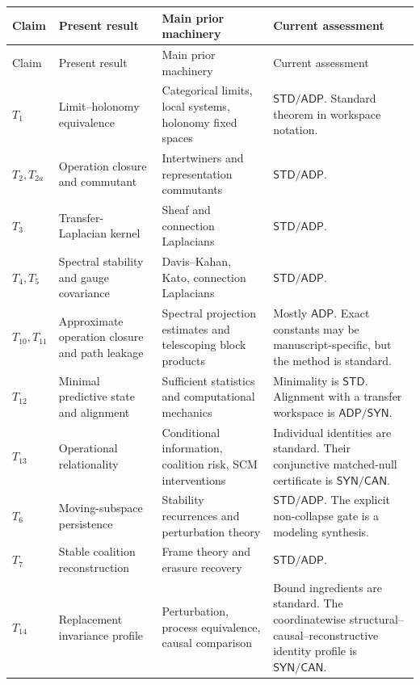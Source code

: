 \small
\begin{longtable}{@{}>{\raggedright\arraybackslash}p{}>{\raggedright\arraybackslash}p{}>{\raggedright\arraybackslash}p{}>{\raggedright\arraybackslash}p{}@{}}
\toprule
Claim & Present result & Main prior machinery & Current assessment \\
\midrule
\endfirsthead
\toprule
Claim & Present result & Main prior machinery & Current assessment \\
\midrule
\endhead
\(T_1\) & Limit--holonomy equivalence & Categorical limits, local systems, holonomy fixed spaces & \(\mathsf{STD}/\mathsf{ADP}\). Standard theorem in workspace notation. \\
\(T_2,T_{2a}\) & Operation closure and commutant & Intertwiners and representation commutants & \(\mathsf{STD}/\mathsf{ADP}\). \\
\(T_3\) & Transfer-Laplacian kernel & Sheaf and connection Laplacians & \(\mathsf{STD}/\mathsf{ADP}\). \\
\(T_4,T_5\) & Spectral stability and gauge covariance & Davis--Kahan, Kato, connection Laplacians & \(\mathsf{STD}/\mathsf{ADP}\). \\
\(T_{10},T_{11}\) & Approximate operation closure and path leakage & Spectral projection estimates and telescoping block products & Mostly \(\mathsf{ADP}\). Exact constants may be manuscript-specific, but the method is standard. \\
\(T_{12}\) & Minimal predictive state and alignment & Sufficient statistics and computational mechanics & Minimality is \(\mathsf{STD}\). Alignment with a transfer workspace is \(\mathsf{ADP}/\mathsf{SYN}\). \\
\(T_{13}\) & Operational relationality & Conditional information, coalition risk, SCM interventions & Individual identities are standard. Their conjunctive matched-null certificate is \(\mathsf{SYN}/\mathsf{CAN}\). \\
\(T_6\) & Moving-subspace persistence & Stability recurrences and perturbation theory & \(\mathsf{STD}/\mathsf{ADP}\). The explicit non-collapse gate is a modeling synthesis. \\
\(T_7\) & Stable coalition reconstruction & Frame theory and erasure recovery & \(\mathsf{STD}/\mathsf{ADP}\). \\
\(T_{14}\) & Replacement invariance profile & Perturbation, process equivalence, causal comparison & Bound ingredients are standard. The coordinatewise structural--causal--reconstructive identity profile is \(\mathsf{SYN}/\mathsf{CAN}\). \\

\end{longtable}
